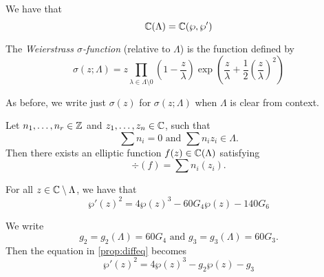 \begin{theorem}
	\label{thm:wp-generates}
	We have that
	\begin{equation*}
		\mathbb{C}(\Lambda) = \mathbb{C}(\wp, \wp')
	\end{equation*}
\end{theorem}

\begin{definition}
	The \emph{Weierstrass $\sigma$-function} (relative to $\Lambda$) is the
	function defined by
	\begin{equation*}
		\sigma(z; \Lambda) = z \prod_{\lambda\in\Lambda\setminus 0}
		\left(1 - \frac{z}{\lambda}\right)
		\exp\left(\frac{z}{\lambda} + \frac{1}{2}\left(\frac{z}{\lambda}\right)^2\right)
	\end{equation*}
\end{definition}

\begin{notation}
	As before, we write just $\sigma(z)$ for $\sigma(z; \Lambda)$ when $\Lambda$
	is clear from context.
\end{notation}

\begin{proposition}
	\label{prop:complex-divisors}
	Let $n_1, \dots, n_r \in \mathbb{Z}$ and $z_1, \dots, z_n \in \mathbb{C}$, such that
	\begin{equation*}
		\sum n_i = 0 \textrm{ and } \sum n_iz_i \in \Lambda.
	\end{equation*}
	Then there exists an elliptic function $f(z) \in \mathbb{C}(\Lambda)$ satisfying
	\begin{equation*}
		\div(f) = \sum n_i(z_i).
	\end{equation*}
\end{proposition}

\begin{proposition}
	\label{prop:diffeq}
	For all $z \in \mathbb{C} \setminus \Lambda$, we have that
	\begin{equation*}
		\wp'(z)^2 = 4\wp(z)^3 - 60G_4\wp(z) - 140G_6
	\end{equation*}
\end{proposition}

\begin{remark}
	We write
	\begin{equation*}
		g_2 = g_2(\Lambda) = 60G_4
		\textrm{ and }
		g_3 = g_3(\Lambda) = 60G_3.
	\end{equation*}
	Then the equation in \ref{prop:diffeq} becomes
	\begin{equation*}
		\wp'(z)^2 = 4\wp(z)^3 - g_2\wp(z) - g_3
	\end{equation*}
\end{remark}


